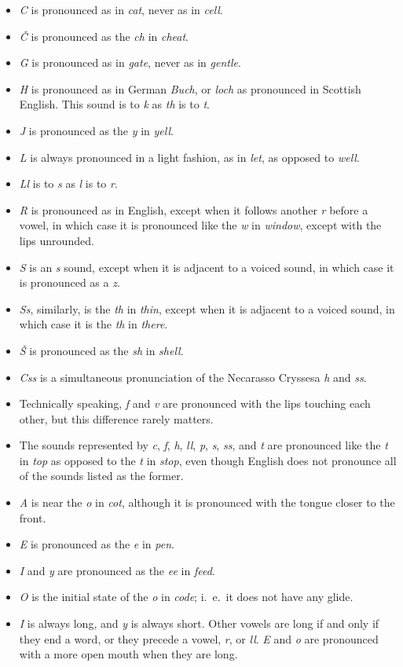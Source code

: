 \begin{itemize}
	\item \emph{C} is pronounced as in \emph{cat}, never as in \emph{cell}.
	\item \emph{\v{C}} is pronounced as the \emph{ch} in \emph{cheat}.
	\item \emph{G} is pronounced as in \emph{gate}, never as in \emph{gentle}.
	\item \emph{H} is pronounced as in German \emph{Buch}, or \emph{loch} as pronounced in Scottish English. This sound is to \emph{k} as \emph{th} is to \emph{t}.
	\item \emph{J} is pronounced as the \emph{y} in \emph{yell}.
	\item \emph{L} is always pronounced in a light fashion, as in \emph{let}, as opposed to \emph{well}.
	\item \emph{Ll} is to \emph{s} as \emph{l} is to \emph{r}.
	\item \emph{R} is pronounced as in English, except when it follows another \emph{r} before a vowel, in which case it is pronounced like the \emph{w} in \emph{window}, except with the lips unrounded.
	\item \emph{S} is an \emph{s} sound, except when it is adjacent to a voiced sound, in which case it is pronounced as a \emph{z}.
	\item \emph{Ss}, similarly, is the \emph{th} in \emph{thin}, except when it is adjacent to a voiced sound, in which case it is the \emph{th} in \emph{there}.
	\item \emph{\v{S}} is pronounced as the \emph{sh} in \emph{shell}.
	\item \emph{Css} is a simultaneous pronunciation of the Necarasso Cryssesa \emph{h} and \emph{ss}.
	\item Technically speaking, \emph{f} and \emph{v} are pronounced with the lips touching each other, but this difference rarely matters.
	\item The sounds represented by \emph{c}, \emph{f}, \emph{h}, \emph{ll}, \emph{p}, \emph{s}, \emph{ss}, and \emph{t} are pronounced like the \emph{t} in \emph{top} as opposed to the \emph{t} in \emph{stop}, even though English does not pronounce all of the sounds listed as the former.
	\item \emph{A} is near the \emph{o} in \emph{cot}, although it is pronounced with the tongue closer to the front.
	\item \emph{E} is pronounced as the \emph{e} in \emph{pen}.
	\item \emph{I} and \emph{y} are pronounced as the \emph{ee} in \emph{feed}.
	\item \emph{O} is the initial state of the \emph{o} in \emph{code}; i.~e.~it does not have any glide.
	\item \emph{I} is always long, and \emph{y} is always short. Other vowels are long if and only if they end a word, or they precede a vowel, \emph{r}, or \emph{ll}. \emph{E} and \emph{o} are pronounced with a more open mouth when they are long.
\end{itemize}

